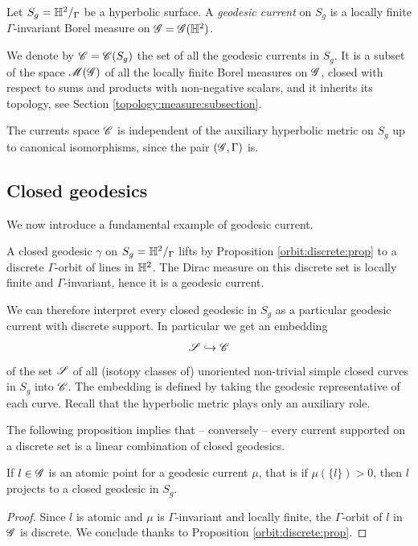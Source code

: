 \begin{defn}
Let $S_g=\mathbb{H}^2/_\Gamma$ be a hyperbolic surface. 
A \emph{geodesic current} on $S_g$ is a locally finite $\Gamma$-invariant Borel measure on $\mathscr{G} = \mathscr{G}(\mathbb{H}^2)$.
\end{defn}

We denote by $\mathscr{C} = \mathscr{C} (S_g)$ the set of all the geodesic currents in $S_g$. It is a subset of the space $\mathscr{M}(\mathscr{G})$ of all the locally finite Borel measures on $\mathscr{G}$, closed with respect to sums and products with non-negative scalars, and it inherits its topology, see Section \ref{topology:measure:subsection}.

The currents space $\mathscr{C}$ is independent of the auxiliary hyperbolic metric on $S_g$ up to canonical isomorphisms, since the pair $(\mathscr{G}, \Gamma)$ is.

\subsection{Closed geodesics}
We now introduce a fundamental example of geodesic current.

\begin{example}
\label{scc:example}
A closed geodesic $\gamma$ on $S_g=\mathbb{H}^2/_\Gamma$ lifts by Proposition \ref{orbit:discrete:prop} to a discrete $\Gamma$-orbit of lines in $\mathbb{H}^2$. The Dirac measure on this discrete set is locally finite and $\Gamma$-invariant, hence it is a geodesic current.
\end{example}

We can therefore interpret every closed geodesic in $S_g$ as a particular geodesic current with discrete support. In particular we get an embedding
$$\mathscr{S} \hookrightarrow \mathscr{C}$$
of the set $\mathscr{S}$ of all (isotopy classes of) unoriented non-trivial simple closed curves in $S_g$ into $\mathscr{C}$. The embedding is defined by taking the geodesic representative of each curve. Recall that the hyperbolic metric plays only an auxiliary role.

The following proposition implies that -- conversely -- every current supported on a discrete set is a linear combination of closed geodesics. 

\begin{prop} \label{atomic:prop}
If $l\in \mathscr{G}$ is an atomic point for a geodesic current $\mu$, that is if $\mu(\{l\})>0$, then $l$ projects to a closed geodesic in $S_g$.
\end{prop}
\begin{proof}
Since $l$ is atomic and $\mu$ is $\Gamma$-invariant and locally finite, the $\Gamma$-orbit of $l$ in $\mathscr{G}$ is discrete. We conclude thanks to Proposition \ref{orbit:discrete:prop}.
\end{proof}

